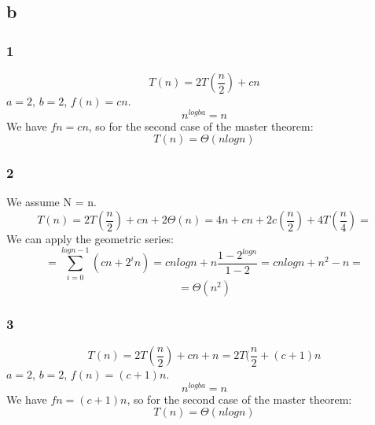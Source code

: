 \subsection*{b}
\subsubsection*{1}

\begin{equation*}
	T(n) = 2T(\frac{n}{2}) + cn 
\end{equation*}
$a = 2$, $b = 2$, $f(n) = cn$.\\
\begin{equation*}
	n^{log{b}a} = n
\end{equation*}
We have $fn = cn$, so for the second case of the master theorem:
\begin{equation*}
	T(n) =\Theta(nlogn)
\end{equation*}

\subsubsection*{2}
We assume N = n.
\begin{equation*}
	T(n) = 2T(\frac{n}{2}) + cn +2\Theta(n) = 4n + cn + 2c(\frac{n}{2}) + 4T(\frac{n}{4}) =
\end{equation*}
We can apply the geometric series:
\begin{equation*}
	= \sum_{i = 0}^{logn -1}(cn + 2^in) = cnlogn + n\frac{1 - 2^{logn} }{1 - 2} = cnlogn + n^2 - n =
\end{equation*}
\begin{equation*}
	= \Theta(n^2)
\end{equation*}

\subsubsection*{3}
\begin{equation*}
	T(n) = 2T(\frac{n}{2}) + cn  + n = 2T(\frac{n}{2} + (c + 1)n
\end{equation*}
$a = 2$, $b = 2$, $f(n) = (c + 1)n$.\\
\begin{equation*}
	n^{log{b}a} = n
\end{equation*}
We have $fn = (c + 1 )n$, so for the second case of the master theorem:
\begin{equation*}
	T(n) =\Theta(nlogn)
\end{equation*}